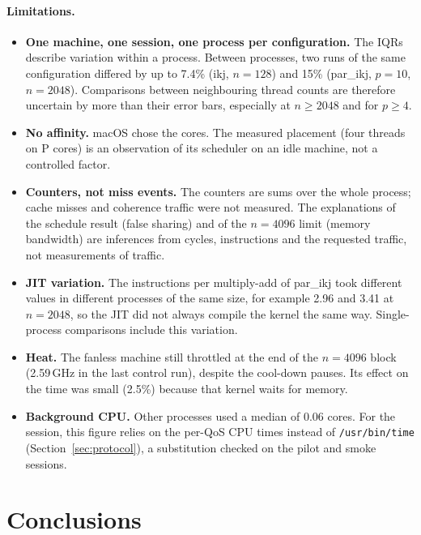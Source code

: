 \documentclass[11pt,a4paper]{article}
\begin{document}
\paragraph{Limitations.}
\begin{itemize}
  \item \textbf{One machine, one session, one process per configuration.} The
  IQRs describe variation within a process. Between processes, two runs of the
  same configuration differed by up to 7.4\% (ikj, $n=128$) and 15\% (par\_ikj,
  $p=10$, $n=2048$). Comparisons between neighbouring thread counts are
  therefore uncertain by more than their error bars, especially at
  $n\ge2048$ and for $p\ge4$.
  \item \textbf{No affinity.} macOS chose the cores. The measured placement
  (four threads on P cores) is an observation of its scheduler on an idle
  machine, not a controlled factor.
  \item \textbf{Counters, not miss events.} The counters are sums over the whole
  process; cache misses and coherence traffic were not measured. The
  explanations of the schedule result (false sharing) and of the $n=4096$
  limit (memory bandwidth) are inferences from cycles, instructions and the
  requested traffic, not measurements of traffic.
  \item \textbf{JIT variation.} The instructions per multiply-add of par\_ikj
  took different values in different processes of the same size, for example
  2.96 and 3.41 at $n=2048$, so the JIT did not always compile the kernel the
  same way. Single-process comparisons include this variation.
  \item \textbf{Heat.} The fanless machine still throttled at the end of the
  $n=4096$ block (2.59\,GHz in the last control run), despite the cool-down
  pauses. Its effect on the time was small (2.5\%) because that kernel waits for
  memory.
  \item \textbf{Background CPU.} Other processes used a median of 0.06 cores.
  For the session, this figure relies on the per-QoS CPU times instead of
  \texttt{/usr/bin/time} (Section~\ref{sec:protocol}), a substitution checked on
  the pilot and smoke sessions.
\end{itemize}

\section{Conclusions}
\label{sec:conclusions}
\end{document}
